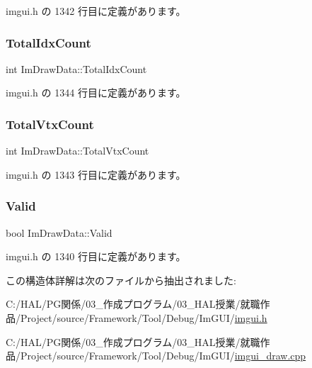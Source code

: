  imgui.\+h の 1342 行目に定義があります。

\mbox{\label{struct_im_draw_data_a1ac8a5d441f464628295ef91a0602fc5}} 
\subsubsection{\texorpdfstring{Total\+Idx\+Count}{TotalIdxCount}}
{\footnotesize\ttfamily int Im\+Draw\+Data\+::\+Total\+Idx\+Count}



 imgui.\+h の 1344 行目に定義があります。

\mbox{\label{struct_im_draw_data_af0035b52cdf91932b25eaf2da853965a}} 
\subsubsection{\texorpdfstring{Total\+Vtx\+Count}{TotalVtxCount}}
{\footnotesize\ttfamily int Im\+Draw\+Data\+::\+Total\+Vtx\+Count}



 imgui.\+h の 1343 行目に定義があります。

\mbox{\label{struct_im_draw_data_ad01ab9ce5e8843b7860ccbb3eb9a6554}} 
\subsubsection{\texorpdfstring{Valid}{Valid}}
{\footnotesize\ttfamily bool Im\+Draw\+Data\+::\+Valid}



 imgui.\+h の 1340 行目に定義があります。



この構造体詳解は次のファイルから抽出されました\+:\begin{DoxyCompactItemize}
\item 
C\+:/\+H\+A\+L/\+P\+G関係/03\+\_\+作成プログラム/03\+\_\+\+H\+A\+L授業/就職作品/\+Project/source/\+Framework/\+Tool/\+Debug/\+Im\+G\+U\+I/\mbox{\hyperlink{imgui_8h}{imgui.\+h}}\item 
C\+:/\+H\+A\+L/\+P\+G関係/03\+\_\+作成プログラム/03\+\_\+\+H\+A\+L授業/就職作品/\+Project/source/\+Framework/\+Tool/\+Debug/\+Im\+G\+U\+I/\mbox{\hyperlink{imgui__draw_8cpp}{imgui\+\_\+draw.\+cpp}}\end{DoxyCompactItemize}
